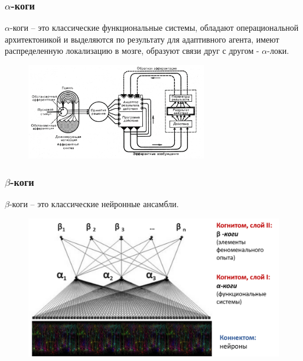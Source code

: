 \documentclass[default]{beamer}
\begin{document}
	\begin{frame}	
		\frametitle{$\alpha$-коги}
		
		$\alpha$-коги – это классические функциональные системы, обладают операциональной архитектоникой
		и выделяются по результату для адаптивного агента, имеют распределенную локализацию в мозге, образуют связи друг с другом - $\alpha$-локи.
		
		\begin{figure}
			\includegraphics[width=0.7\textwidth]{func_system}
		\end{figure}
	\end{frame}		
	
	\begin{frame}	
		\frametitle{$\beta$-коги}
		
		$\beta$-коги – это классические нейронные ансамбли.
		
		\begin{figure}
			\includegraphics[width=\textwidth]{beta-cog}
		\end{figure}
	\end{frame}	
	
\end{document}
